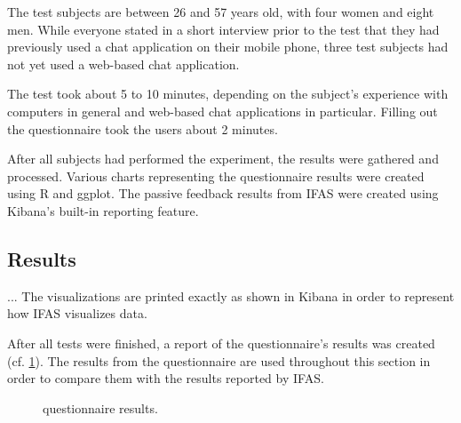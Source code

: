The test subjects are between 26 and 57 years old, with four women and eight men.
While everyone stated in a short interview prior to the test that they had previously used a chat application on their mobile phone, three test subjects had not yet used a web-based chat application.

The test took about 5 to 10 minutes, depending on the subject's experience with computers in general and web-based chat applications in particular.
Filling out the questionnaire took the users about 2 minutes.

After all subjects had performed the experiment, the results were gathered and processed.
Various charts representing the questionnaire results were created using R and ggplot.
The passive feedback results from \ac{IFAS} were created using Kibana's built-in reporting feature.

\subsection{Results}

...
The visualizations are printed exactly as shown in Kibana in order to represent how \ac{IFAS} visualizes data.

After all tests were finished, a report of the questionnaire's results was created (cf. \cref{figure:evaluation:user:survey-report}).
The results from the questionnaire are used throughout this section in order to compare them with the results reported by \ac{IFAS}.

\begin{figure}[h]
        \caption{questionnaire results.}
        \label{figure:evaluation:user:survey-report}
\end{figure}


